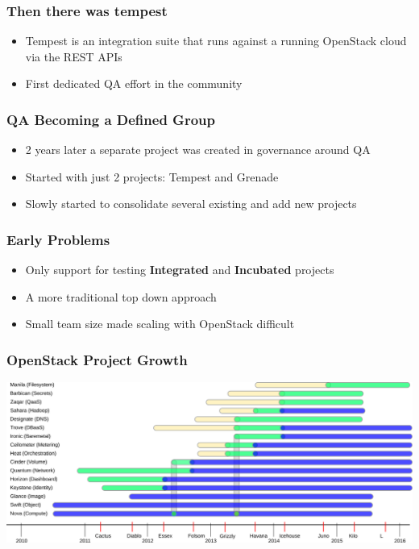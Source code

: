 \documentclass[aspectratio=169,11pt,hyperref={colorlinks=true}]{beamer}
\begin{document}
\begin{frame}
    \frametitle{Then there was tempest}
    \begin{itemize}
        \item Tempest is an integration suite that runs against a running
            OpenStack cloud via the REST APIs
        \item First dedicated QA effort in the community
    \end{itemize}
\end{frame}

\begin{frame}
    \frametitle{QA Becoming a Defined Group}
    \begin{itemize}
        \item 2 years later a separate project was created in governance around QA
        \item Started with just 2 projects: Tempest and Grenade
        \item Slowly started to consolidate several existing and add new projects
    \end{itemize}
\end{frame}

\begin{frame}
    \frametitle{Early Problems}
    \begin{itemize}
        \item Only support for testing \textbf{Integrated} and \textbf{Incubated} projects
        \item A more traditional top down approach
        \item Small team size made scaling with OpenStack difficult
    \end{itemize}
\end{frame}

\begin{frame}
    \frametitle{OpenStack Project Growth}
    \begin{center}
        \includegraphics[width=\textwidth]{OpenStack_Components.png}
    \end{center}
\end{frame}
\end{document}
